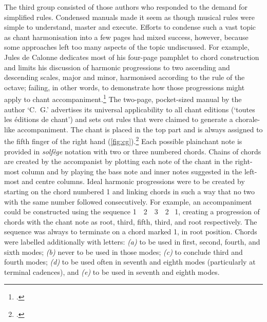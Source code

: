 The third group consisted of those authors who responded to the demand for simplified rules.
Condensed manuals made it seem as though musical rules were simple to understand, master and execute.
Efforts to condense such a vast topic as chant harmonisation into a few pages had mixed success, however, because some approaches left too many aspects of the topic undiscussed.
For example, Jules de Calonne dedicates most of his four-page pamphlet to chord construction and limits his discussion of harmonic progressions to two ascending and descending scales, major and minor, harmonised according to the rule of the octave; failing, in other words, to demonstrate how those progressions might apply to chant accompaniment.\footcite[1--4]{CalonnePetitguideaccompagnateur1859}
%
The two-page, pocket-sized manual by the author `C.~G.' advertises its universal applicability to all chant editions (`toutes les éditions de chant') and sets out rules that were claimed to generate a chorale-like accompaniment.
The chant is placed in the top part and is always assigned to the fifth finger of the right hand (\cref{fig:cg}).\footcite[1--4]{G.Accompagnementplainchant1884}
Each possible plainchant note is provided in \emph{solfège} notation with two or three numbered chords.
Chains of chords are created by the accompanist by plotting each note of the chant in the right-most column and by playing the bass note and inner notes suggested in the left-most and centre columns.
Ideal harmonic progressions were to be created by starting on the chord numbered 1 and linking chords in such a way that no two with the same number followed consecutively.
For example, an accompaniment could be constructed using the sequence 1~\rightarrow{}~2~\rightarrow{}~3~\rightarrow{}~2~\rightarrow{} 1, creating a progression of chords with the chant note as root, third, fifth, third, and root respectively.
The sequence was always to terminate on a chord marked 1, in root position.
Chords were labelled additionally with letters: \emph{(a)} to be used in first, second, fourth, and sixth modes; \emph{(b)} never to be used in those modes; \textit{(c)} to conclude third and fourth modes; \textit{(d)} to be used often in seventh and eighth modes (particularly at terminal cadences), and \textit{(e)} to be used in seventh and eighth modes.
%
\noclub[2]

